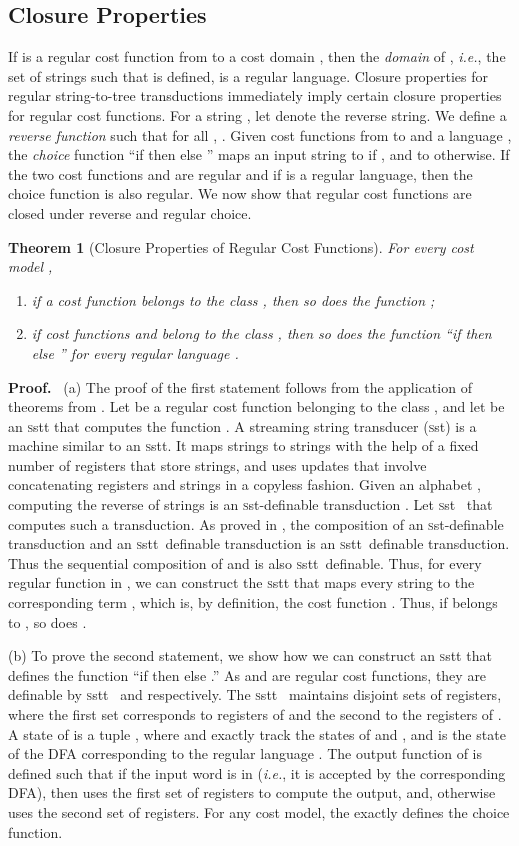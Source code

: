 \documentclass[11pt]{article}
\newtheorem{theorem}{Theorem}
\def\Proof{{\bf Proof.}}
\def\qed{{\bf }}
\newcommand{\mypar}[1]{\subsection{#1}}
\def\qed{{\bf }}
\newcommand{\SST}{{\sc\textsc sst}}
\newcommand{\SSTT}{{\sc\textsc sstt}\xspace}
\newcommand{\ie}{{\em i.e.}\xspace}
\begin{document}
\mypar{Closure Properties}
If  is a regular cost function from  to a cost domain
, then the {\em domain} of , \ie, the set of strings 
such that  is defined, is a regular language. Closure properties
for regular string-to-tree transductions immediately imply certain
closure properties for regular cost functions.  For a string , let
 denote the reverse string.  We define a {\em reverse function}
 such that for all , .
Given cost functions  from  to  and a
language , the {\em choice\/} function ``if 
then  else '' maps an input string  to  if , and to  otherwise.  If the two cost functions  and
 are regular and if  is a regular language, then the choice
function is also regular. We now show that regular cost functions are
closed under reverse and regular choice.

\begin{theorem}[Closure Properties of Regular Cost Functions]
For every cost model ,
\begin{enumerate}
\item[(a)]
if a cost function  belongs to the class , then
so does the function ;
\item[(b)]
if cost functions  and  belong to the class ,
then so does the function ``if  then  else '' for every regular language .
\end{enumerate}
\end{theorem}

\Proof~ (a) The proof of the first statement follows from the
application of theorems from
\cite{alur_expressiveness_2010,alur_stt_2011}.  Let  be a regular
cost function belonging to the class , and let
 be an \SSTT that computes the function . A streaming string
transducer (\SST) is a machine similar to an \SSTT. It maps strings to
strings with the help of a fixed number of registers that store
strings, and uses updates that involve concatenating registers and
strings in a copyless fashion.  Given an alphabet , computing
the reverse  of strings  is an \SST-definable
transduction \cite{alur_expressiveness_2010}.  Let \SST~ that
computes such a transduction. As proved in \cite{alur_stt_2011}, the
composition of an \SST-definable transduction and an \SSTT~definable
transduction is an \SSTT~definable transduction.  Thus the sequential
composition of  and  is also \SSTT~definable. Thus, for
every regular function  in , we can construct the
\SSTT  that maps every string  to the
corresponding term , which is, by definition, the cost
function .   Thus, if  belongs to , so
does .

(b) To prove the second statement, we show how we can construct an
\SSTT  that defines the function ``if  then  else
.''  As  and  are regular cost functions, they are
definable by \SSTT~ and  respectively. The
\SSTT~ maintains  disjoint sets of registers, where the
first set corresponds to registers of  and the second to the
registers of . A state of  is a tuple ,
where  and  exactly track the states of  and
, and  is the state of the DFA corresponding to the regular
language . The output function of  is defined such that if
the input word  is in  (\ie, it is accepted by the corresponding
DFA), then  uses the first set of registers to compute the
output, and, otherwise uses the second set of registers.  For any cost
model, the  exactly defines the choice function.  \qed
\end{document}
